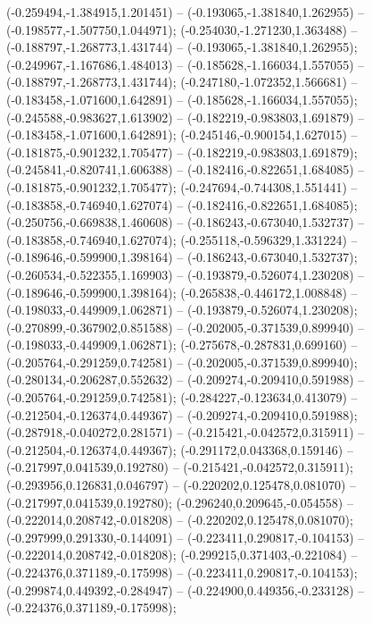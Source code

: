  (-0.259494,-1.384915,1.201451) -- (-0.193065,-1.381840,1.262955) -- (-0.198577,-1.507750,1.044971);
 (-0.254030,-1.271230,1.363488) -- (-0.188797,-1.268773,1.431744) -- (-0.193065,-1.381840,1.262955);
 (-0.249967,-1.167686,1.484013) -- (-0.185628,-1.166034,1.557055) -- (-0.188797,-1.268773,1.431744);
 (-0.247180,-1.072352,1.566681) -- (-0.183458,-1.071600,1.642891) -- (-0.185628,-1.166034,1.557055);
 (-0.245588,-0.983627,1.613902) -- (-0.182219,-0.983803,1.691879) -- (-0.183458,-1.071600,1.642891);
 (-0.245146,-0.900154,1.627015) -- (-0.181875,-0.901232,1.705477) -- (-0.182219,-0.983803,1.691879);
 (-0.245841,-0.820741,1.606388) -- (-0.182416,-0.822651,1.684085) -- (-0.181875,-0.901232,1.705477);
 (-0.247694,-0.744308,1.551441) -- (-0.183858,-0.746940,1.627074) -- (-0.182416,-0.822651,1.684085);
 (-0.250756,-0.669838,1.460608) -- (-0.186243,-0.673040,1.532737) -- (-0.183858,-0.746940,1.627074);
 (-0.255118,-0.596329,1.331224) -- (-0.189646,-0.599900,1.398164) -- (-0.186243,-0.673040,1.532737);
 (-0.260534,-0.522355,1.169903) -- (-0.193879,-0.526074,1.230208) -- (-0.189646,-0.599900,1.398164);
 (-0.265838,-0.446172,1.008848) -- (-0.198033,-0.449909,1.062871) -- (-0.193879,-0.526074,1.230208);
 (-0.270899,-0.367902,0.851588) -- (-0.202005,-0.371539,0.899940) -- (-0.198033,-0.449909,1.062871);
 (-0.275678,-0.287831,0.699160) -- (-0.205764,-0.291259,0.742581) -- (-0.202005,-0.371539,0.899940);
 (-0.280134,-0.206287,0.552632) -- (-0.209274,-0.209410,0.591988) -- (-0.205764,-0.291259,0.742581);
 (-0.284227,-0.123634,0.413079) -- (-0.212504,-0.126374,0.449367) -- (-0.209274,-0.209410,0.591988);
 (-0.287918,-0.040272,0.281571) -- (-0.215421,-0.042572,0.315911) -- (-0.212504,-0.126374,0.449367);
 (-0.291172,0.043368,0.159146) -- (-0.217997,0.041539,0.192780) -- (-0.215421,-0.042572,0.315911);
 (-0.293956,0.126831,0.046797) -- (-0.220202,0.125478,0.081070) -- (-0.217997,0.041539,0.192780);
 (-0.296240,0.209645,-0.054558) -- (-0.222014,0.208742,-0.018208) -- (-0.220202,0.125478,0.081070);
 (-0.297999,0.291330,-0.144091) -- (-0.223411,0.290817,-0.104153) -- (-0.222014,0.208742,-0.018208);
 (-0.299215,0.371403,-0.221084) -- (-0.224376,0.371189,-0.175998) -- (-0.223411,0.290817,-0.104153);
 (-0.299874,0.449392,-0.284947) -- (-0.224900,0.449356,-0.233128) -- (-0.224376,0.371189,-0.175998);
